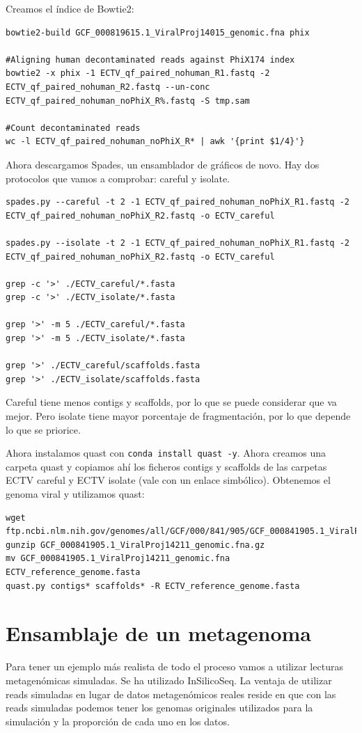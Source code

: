 Creamos el índice de Bowtie2:
\begin{lstlisting}
bowtie2-build GCF_000819615.1_ViralProj14015_genomic.fna phix

#Aligning human decontaminated reads against PhiX174 index
bowtie2 -x phix -1 ECTV_qf_paired_nohuman_R1.fastq -2 ECTV_qf_paired_nohuman_R2.fastq --un-conc ECTV_qf_paired_nohuman_noPhiX_R%.fastq -S tmp.sam

#Count decontaminated reads
wc -l ECTV_qf_paired_nohuman_noPhiX_R* | awk '{print $1/4}'}
\end{lstlisting}

Ahora descargamos Spades, un ensamblador de gráficos de novo. Hay dos protocolos que vamos a comprobar: careful y isolate.
\begin{lstlisting}
spades.py --careful -t 2 -1 ECTV_qf_paired_nohuman_noPhiX_R1.fastq -2 ECTV_qf_paired_nohuman_noPhiX_R2.fastq -o ECTV_careful

spades.py --isolate -t 2 -1 ECTV_qf_paired_nohuman_noPhiX_R1.fastq -2 ECTV_qf_paired_nohuman_noPhiX_R2.fastq -o ECTV_careful

grep -c '>' ./ECTV_careful/*.fasta
grep -c '>' ./ECTV_isolate/*.fasta

grep '>' -m 5 ./ECTV_careful/*.fasta
grep '>' -m 5 ./ECTV_isolate/*.fasta

grep '>' ./ECTV_careful/scaffolds.fasta
grep '>' ./ECTV_isolate/scaffolds.fasta
\end{lstlisting}

Careful tiene menos contigs y scaffolds, por lo que se puede considerar que va mejor. Pero isolate tiene mayor porcentaje de fragmentación, por lo que depende lo que se priorice. 

Ahora instalamos quast con \texttt{conda install quast -y}. Ahora creamos una carpeta quast y copiamos ahí los ficheros contigs y scaffolds de las carpetas ECTV careful y ECTV isolate (vale con un enlace simbólico). Obtenemos el genoma viral y utilizamos quast:

\begin{lstlisting}
wget ftp.ncbi.nlm.nih.gov/genomes/all/GCF/000/841/905/GCF_000841905.1_ViralProj14211/GCF_000841905.1_ViralProj14211_genomic.fna.gz
gunzip GCF_000841905.1_ViralProj14211_genomic.fna.gz
mv GCF_000841905.1_ViralProj14211_genomic.fna ECTV_reference_genome.fasta
quast.py contigs* scaffolds* -R ECTV_reference_genome.fasta
\end{lstlisting}

\section{Ensamblaje de un metagenoma}
Para tener un ejemplo más realista de todo el proceso vamos a utilizar lecturas metagenómicas simuladas. Se ha utilizado InSilicoSeq. La ventaja de utilizar reads simuladas en lugar de datos metagenómicos reales reside en que con las reads simuladas podemos tener los genomas originales utilizados para la simulación y la proporción de cada uno en los datos.

